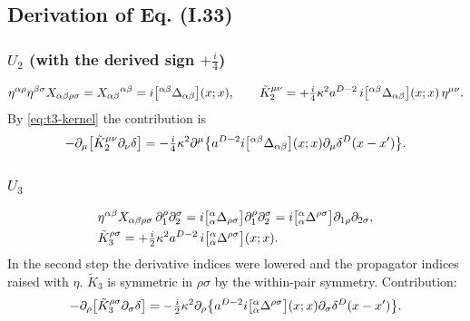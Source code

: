 \subsection{Derivation of Eq. (I.33)}\label{sec:t3-I33}

\subsubsection{\texorpdfstring{$U_2$}{U2} (with the derived sign \texorpdfstring{$+\tfrac i4$}{+i/4})}
\begin{equation}\label{eq:t3-K2}
\eta^{\alpha\rho}\eta^{\beta\sigma}X_{\alpha\beta\rho\sigma}=X_{\alpha\beta}{}^{\alpha\beta}=i\bigl[{}^{\alpha\beta}\Delta_{\alpha\beta}\bigr](x;x),\qquad
\tilde K_2^{\mu\nu}=+\tfrac i4\kappa^2a^{D-2}\,i\bigl[{}^{\alpha\beta}\Delta_{\alpha\beta}\bigr](x;x)\,\eta^{\mu\nu}.
\end{equation}
By \eqref{eq:t3-kernel} the contribution is
\begin{equation*}
-\partial_\mu\bigl[\tilde K_2^{\mu\nu}\partial_\nu\delta\bigr]
=-\tfrac i4\kappa^2\partial^\mu\bigl\{a^{D-2}i\bigl[{}^{\alpha\beta}\Delta_{\alpha\beta}\bigr](x;x)\partial_\mu\delta^D(x-x')\bigr\}.
\end{equation*}

\subsubsection{\texorpdfstring{$U_3$}{U3}}
\begin{equation}\label{eq:t3-K3}
\begin{aligned}
\relax&\eta^{\alpha\beta}X_{\alpha\beta\rho\sigma}\,\partial_1^\rho\partial_2^\sigma
=i\bigl[{}^\alpha_\alpha\Delta_{\rho\sigma}\bigr]\partial_1^\rho\partial_2^\sigma
=i\bigl[{}^\alpha_\alpha\Delta^{\rho\sigma}\bigr]\partial_{1\rho}\partial_{2\sigma},\\
&\tilde K_3^{\rho\sigma}=+\tfrac i2\kappa^2a^{D-2}\,i\bigl[{}^\alpha_\alpha\Delta^{\rho\sigma}\bigr](x;x).
\end{aligned}
\end{equation}
In the second step the derivative indices were lowered and the propagator indices raised
with \(\eta\). \(\tilde K_3\) is symmetric in \(\rho\sigma\) by the within-pair symmetry.
Contribution:
\begin{equation*}
-\partial_\rho\bigl[\tilde K_3^{\rho\sigma}\partial_\sigma\delta\bigr]
=-\tfrac i2\kappa^2\partial_\rho\bigl\{a^{D-2}i\bigl[{}^\alpha_\alpha\Delta^{\rho\sigma}\bigr](x;x)\partial_\sigma\delta^D(x-x')\bigr\}.
\end{equation*}


